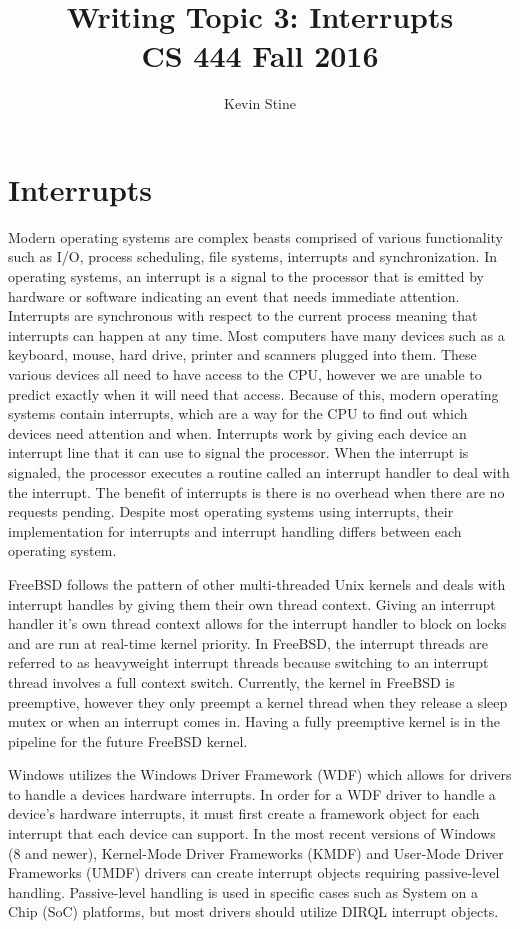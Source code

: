 \documentclass[letterpaper,10pt,draftclsnofoot,onecolumn,titlepage]{IEEEtran}
\def\name{Kevin Stine}
\begin{document}
	\title{\huge Writing Topic 3: Interrupts\\CS 444 Fall 2016}
	\author{\large \name}
	\maketitle
	\newpage
	\section*{Interrupts}
		Modern operating systems are complex beasts comprised of various functionality such as I/O, process scheduling, file systems, interrupts and synchronization.
	  In operating systems, an interrupt is a signal to the processor that is emitted by hardware or software indicating an event that needs immediate attention.
		Interrupts are synchronous with respect to the current process meaning that interrupts can happen at any time.
		Most computers have many devices such as a keyboard, mouse, hard drive, printer and scanners plugged into them.
		These various devices all need to have access to the CPU, however we are unable to predict exactly when it will need that access.
		Because of this, modern operating systems contain interrupts, which are a way for the CPU to find out which devices need attention and when.
		Interrupts work by giving each device an interrupt line that it can use to signal the processor.
		When the interrupt is signaled, the processor executes a routine called an interrupt handler to deal with the interrupt.
		The benefit of interrupts is there is no overhead when there are no requests pending.
		Despite most operating systems using interrupts, their implementation for interrupts and interrupt handling differs between each operating system.

		FreeBSD follows the pattern of other multi-threaded Unix kernels and deals with interrupt handles by giving them their own thread context.
		Giving an interrupt handler it's own thread context allows for the interrupt handler to block on locks and are run at real-time kernel priority.
		In FreeBSD, the interrupt threads are referred to as heavyweight interrupt threads because switching to an interrupt thread involves a full context switch.
		Currently, the kernel in FreeBSD is preemptive, however they only preempt a kernel thread when they release a sleep mutex or when an interrupt comes in.
		Having a fully preemptive kernel is in the pipeline for the future FreeBSD kernel.

		Windows utilizes the Windows Driver Framework (WDF) which allows for drivers to handle a devices hardware interrupts.
		In order for a WDF driver to handle a device's hardware interrupts, it must first create a framework object for each interrupt that each device can support.
		In the most recent versions of Windows (8 and newer), Kernel-Mode Driver Frameworks (KMDF) and User-Mode Driver Frameworks (UMDF) drivers can create interrupt objects requiring passive-level handling.
		Passive-level handling is used in specific cases such as System on a Chip (SoC) platforms, but most drivers should utilize DIRQL interrupt objects.
\end{document}
